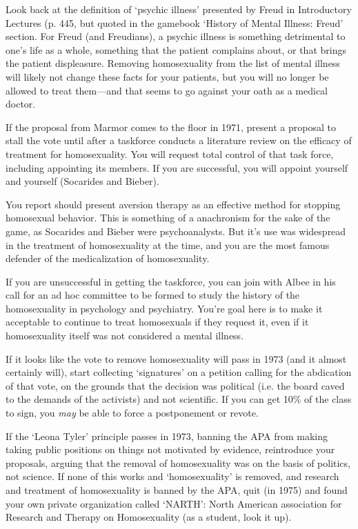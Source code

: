 Look back at the definition of `psychic illness' presented by Freud in Introductory Lectures (p. 445, but quoted in the gamebook `History of Mental Illness: Freud' section. For Freud (and Freudians), a psychic illness is something detrimental to one's life as a whole, something that the patient complains about, or that brings the patient displeasure. Removing homosexuality from the list of mental illness will likely not change these facts for your patients, but you will no longer be allowed to treat them---and that seems to go against your oath as a medical doctor.

If the proposal from Marmor comes to the floor in 1971, present a proposal to stall the vote until after a taskforce conducts a literature review on the efficacy of treatment for homosexuality. You will request total control of that task force, including appointing its members. If you are successful, you will appoint yourself and yourself (Socarides and Bieber). 

You report should present aversion therapy as an effective method for stopping homosexual behavior. This is something of a anachronism for the sake of the game, as Socarides and Bieber were psychoanalysts. But it's use was widespread in the treatment of homosexuality at the time, and you are the most famous defender of the medicalization of homosexuality.

If you are unsuccessful in getting the taskforce, you can join with Albee in his call for an ad hoc committee to be formed to study the history of the homosexuality in psychology and psychiatry. You're goal here is to make it acceptable to continue to treat homosexuals if they request it, even if it homosexuality itself was not considered a mental illness.

If it looks like the vote to remove homosexuality will pass in 1973 (and it almost certainly will), start collecting `signatures' on a petition calling for the abdication of that vote, on the grounds that the decision was political (i.e. the board caved to the demands of the activists) and not scientific. If you can get 10\% of the class to sign, you \emph{may} be able to force a postponement or revote.

If the `Leona Tyler' principle passes in 1973, banning the APA from making taking public positions on things not motivated by evidence, reintroduce your proposals, arguing that the removal of homosexuality was on the basis of politics, not science. If none of this works and `homosexuality' is removed, and research and treatment of homosexuality is banned by the APA, quit (in 1975) and found your own private organization called `NARTH': North American association for Research and Therapy on Homosexuality (as a student, look it up).

